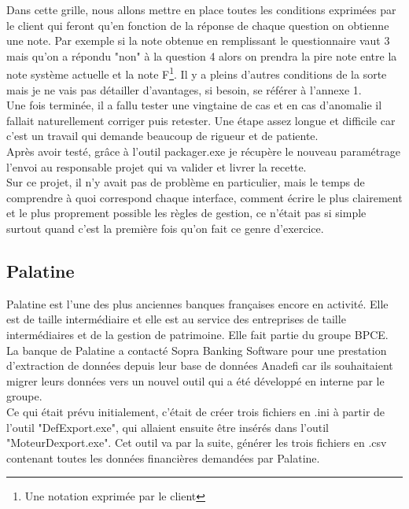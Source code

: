Dans cette grille, nous allons mettre en place toutes les conditions exprimées par le client qui feront qu'en fonction de la réponse de chaque question on obtienne une note. Par exemple si la note obtenue en remplissant le questionnaire vaut 3 mais qu'on a répondu "non" à la question 4 alors on prendra la pire note entre la note système actuelle et la note F\footnote{Une notation exprimée par le client}. Il y a pleins d'autres conditions de la sorte mais je ne vais pas détailler d'avantages, si besoin, se référer à l'annexe 1.\\

Une fois terminée, il a fallu tester une vingtaine de cas et en cas d'anomalie il fallait naturellement corriger puis retester. Une étape assez longue et difficile car c'est un travail qui demande beaucoup de rigueur et de patiente.\\

Après avoir testé, grâce à l'outil packager.exe je récupère le nouveau paramétrage l'envoi au responsable projet qui va valider et livrer la recette.\\

Sur ce projet, il n'y avait pas de problème en particulier, mais le temps de comprendre à quoi correspond chaque interface, comment écrire le plus clairement et le plus proprement possible les règles de gestion, ce n'était pas si simple surtout quand c'est la première fois qu'on fait ce genre d'exercice.


\subsection{Palatine}

Palatine est l'une des plus anciennes banques françaises encore en activité. Elle est de taille intermédiaire et elle est au service des entreprises de taille intermédiaires et de la gestion de patrimoine. Elle fait partie du groupe BPCE.\\

La banque de Palatine a contacté Sopra Banking Software pour une prestation d'extraction de données depuis leur base de données Anadefi car ils souhaitaient migrer leurs données vers un nouvel outil qui a été développé en interne par le groupe.\\

Ce qui était prévu initialement, c'était de créer trois fichiers en .ini à partir de l'outil "DefExport.exe", qui allaient ensuite être insérés dans l'outil "MoteurDexport.exe". Cet outil va par la suite, générer les trois fichiers en .csv contenant toutes les données financières demandées par Palatine.\\

